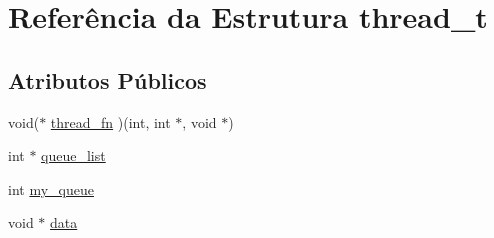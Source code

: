\hypertarget{structthread__t}{
\section{Referência da Estrutura thread\_\-t}
\label{structthread__t}
}
\subsection*{Atributos Públicos}
\begin{DoxyCompactItemize}
\item 
void($\ast$ \hyperlink{structthread__t_af1823bc43b90c985e7dbc7e0a74ff543}{thread\_\-fn} )(int, int $\ast$, void $\ast$)
\item 
int $\ast$ \hyperlink{structthread__t_a551de490b7ea93752ec46ce60a241c22}{queue\_\-list}
\item 
int \hyperlink{structthread__t_ae76fa92871d4b1d1d8ef76dbb4f9ba33}{my\_\-queue}
\item 
void $\ast$ \hyperlink{structthread__t_a757f72629b527b6b5b824e88561c19fe}{data}
\end{DoxyCompactItemize}


